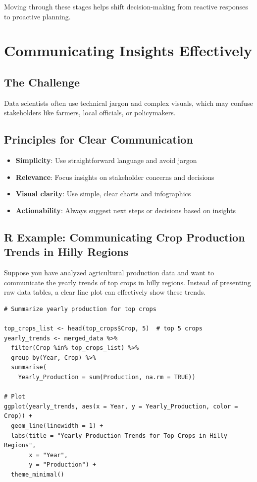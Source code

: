 Moving through these stages helps shift decision-making from reactive responses to proactive planning.

\section{Communicating Insights Effectively}

\subsection*{The Challenge}
Data scientists often use technical jargon and complex visuals, which may confuse stakeholders like farmers, local officials, or policymakers.

\subsection*{Principles for Clear Communication}
\begin{itemize}
    \item \textbf{Simplicity}: Use straightforward language and avoid jargon
    \item \textbf{Relevance}: Focus insights on stakeholder concerns and decisions
    \item \textbf{Visual clarity}: Use simple, clear charts and infographics
    \item \textbf{Actionability}: Always suggest next steps or decisions based on insights
\end{itemize}

\subsection*{R Example: Communicating Crop Production Trends in Hilly Regions}

Suppose you have analyzed agricultural production data and want to communicate the yearly trends of top crops in hilly regions. Instead of presenting raw data tables, a clear line plot can effectively show these trends.

\begin{verbatim}
# Summarize yearly production for top crops

top_crops_list <- head(top_crops$Crop, 5)  # top 5 crops
yearly_trends <- merged_data %>%
  filter(Crop %in% top_crops_list) %>%
  group_by(Year, Crop) %>%
  summarise(
    Yearly_Production = sum(Production, na.rm = TRUE))

# Plot
ggplot(yearly_trends, aes(x = Year, y = Yearly_Production, color = Crop)) +
  geom_line(linewidth = 1) +
  labs(title = "Yearly Production Trends for Top Crops in Hilly Regions",
       x = "Year",
       y = "Production") +
  theme_minimal()
\end{verbatim}

